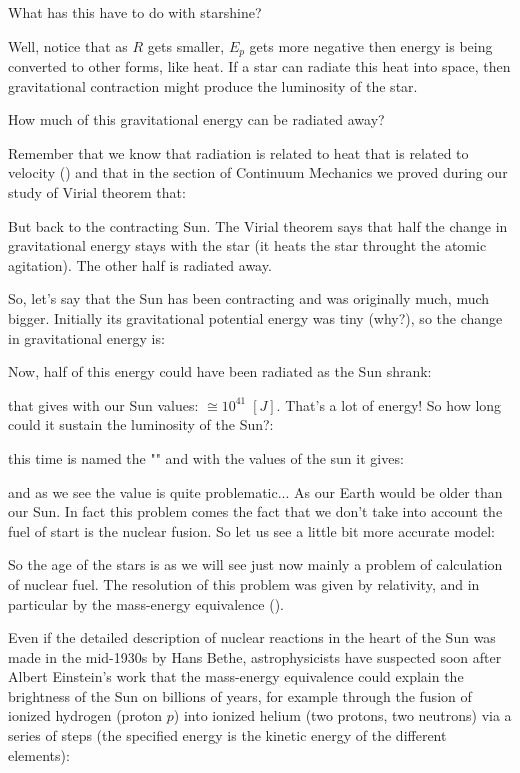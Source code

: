 	What has this have to do with starshine?

	Well, notice that as $R$ gets smaller, $E_p$ gets more negative then energy is being converted to other forms, like heat. If a star can radiate this heat into space, then gravitational contraction might produce the luminosity of the star.
	
	How much of this gravitational energy can be radiated away? 
	
	Remember that we know that radiation is related to heat that is related to velocity () and that in the section of Continuum Mechanics we proved during our study of Virial theorem that:
	 
	But back to the contracting Sun. The Virial theorem says that half the change in gravitational energy stays with the star (it heats the star throught the atomic agitation). The other half is radiated away.
	
	So, let's say that the Sun has been contracting and was originally much, much bigger.  Initially its gravitational potential energy was tiny (why?), so the change in gravitational energy is:
	
	Now, half of this energy could have been radiated as the Sun shrank:
	
	that gives with our Sun values: $\cong 10^{41}\;[J]$. That's a lot of energy! So how long could it sustain the luminosity of the Sun?:
	
	this time is named the "" and with the values of the sun it gives:
	
	and as we see the value is quite problematic... As our Earth would be older than our Sun. In fact this problem comes the fact that we don't take into account the fuel of start is the nuclear fusion. So let us see a little bit more accurate model:
	
	So the age of the stars is as we will see just now mainly a problem of calculation of nuclear fuel. The resolution of this problem was given by relativity, and in particular by the mass-energy equivalence ().

	Even if the detailed description of nuclear reactions in the heart of the Sun was made in the mid-1930s by Hans Bethe, astrophysicists have suspected soon after Albert Einstein's work that the mass-energy equivalence could explain the brightness of the Sun on billions of years, for example through the fusion of ionized hydrogen (proton $p$) into ionized helium (two protons, two neutrons) via a series of steps (the specified energy is the kinetic energy of the different elements):
	
